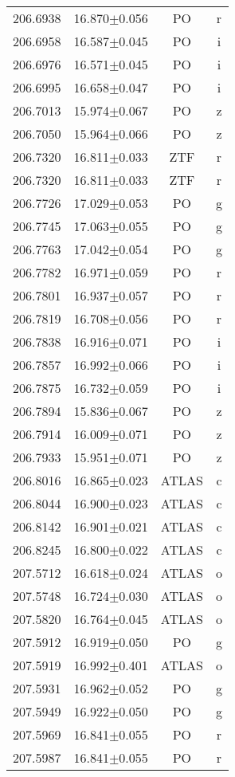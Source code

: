 \begin{table}
\begin{tabular}{cccc}
206.6938 & 16.870$\pm$0.056 & PO & r \\
206.6958 & 16.587$\pm$0.045 & PO & i \\
206.6976 & 16.571$\pm$0.045 & PO & i \\
206.6995 & 16.658$\pm$0.047 & PO & i \\
206.7013 & 15.974$\pm$0.067 & PO & z \\
206.7050 & 15.964$\pm$0.066 & PO & z \\
206.7320 & 16.811$\pm$0.033 & ZTF & r \\
206.7320 & 16.811$\pm$0.033 & ZTF & r \\
206.7726 & 17.029$\pm$0.053 & PO & g \\
206.7745 & 17.063$\pm$0.055 & PO & g \\
206.7763 & 17.042$\pm$0.054 & PO & g \\
206.7782 & 16.971$\pm$0.059 & PO & r \\
206.7801 & 16.937$\pm$0.057 & PO & r \\
206.7819 & 16.708$\pm$0.056 & PO & r \\
206.7838 & 16.916$\pm$0.071 & PO & i \\
206.7857 & 16.992$\pm$0.066 & PO & i \\
206.7875 & 16.732$\pm$0.059 & PO & i \\
206.7894 & 15.836$\pm$0.067 & PO & z \\
206.7914 & 16.009$\pm$0.071 & PO & z \\
206.7933 & 15.951$\pm$0.071 & PO & z \\
206.8016 & 16.865$\pm$0.023 & ATLAS & c \\
206.8044 & 16.900$\pm$0.023 & ATLAS & c \\
206.8142 & 16.901$\pm$0.021 & ATLAS & c \\
206.8245 & 16.800$\pm$0.022 & ATLAS & c \\
207.5712 & 16.618$\pm$0.024 & ATLAS & o \\
207.5748 & 16.724$\pm$0.030 & ATLAS & o \\
207.5820 & 16.764$\pm$0.045 & ATLAS & o \\
207.5912 & 16.919$\pm$0.050 & PO & g \\
207.5919 & 16.992$\pm$0.401 & ATLAS & o \\
207.5931 & 16.962$\pm$0.052 & PO & g \\
207.5949 & 16.922$\pm$0.050 & PO & g \\
207.5969 & 16.841$\pm$0.055 & PO & r \\
207.5987 & 16.841$\pm$0.055 & PO & r \\

\end{tabular}
\end{table}
